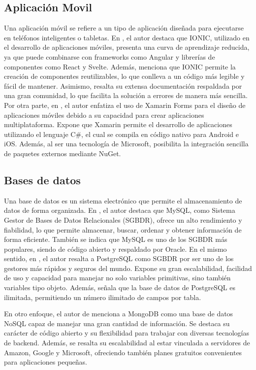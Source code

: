 \subsection{Aplicación Movil}
Una aplicación móvil se refiere a un tipo de aplicación diseñada para ejecutarse en teléfonos inteligentes o tabletas.
En \cite{chasichangoAplicacionMovilApoyo2022}, el autor destaca que IONIC, utilizado en el desarrollo de aplicaciones
móviles, presenta una curva de aprendizaje reducida, ya que puede combinarse con frameworks como Angular y librerías de
componentes como React y Svelte. Además, menciona que IONIC permite la creación de componentes reutilizables, lo que conlleva
a un código más legible y fácil de mantener. Asimismo, resalta su extensa documentación respaldada por una gran comunidad,
lo que facilita la solución a errores de manera más sencilla. Por otra parte, en \cite{lesanoperezAplicativoMovilGeoubicacion2022},
el autor enfatiza el uso de Xamarin Forms para el diseño de aplicaciones móviles debido a su capacidad para crear aplicaciones
multiplataforma. Expone que Xamarin permite el desarrollo de aplicaciones utilizando el lenguaje C\#, el cual se compila en
código nativo para Android e iOS. Además, al ser una tecnología de Microsoft, posibilita la integración sencilla de paquetes
externos mediante NuGet.

\subsection{Bases de datos}
Una base de datos es un sistema electrónico que permite el almacenamiento de datos de forma organizada.
En \cite{chicaizavillegasAplicacionWebPara2023}, el autor destaca que MySQL, como Sistema Gestor de Bases de Datos Relacionales
(SGBDR), ofrece un alto rendimiento y fiabilidad, lo que permite almacenar, buscar, ordenar y obtener información de forma eficiente.
También se indica que MySQL es uno de los SGBDR más populares, siendo de
código abierto y respaldado por Oracle. En el mismo sentido, en \cite{lesanoperezAplicativoMovilGeoubicacion2022}, el autor
resalta a PostgreSQL como SGBDR por ser uno de los gestores más rápidos y seguros del mundo. Expone su gran escalabilidad,
facilidad de uso y capacidad para manejar no solo variables primitivas, sino también variables tipo objeto. Además, señala que
la base de datos de PostgreSQL es ilimitada, permitiendo un número ilimitado de campos por tabla.

\bigbreak
En otro enfoque, el autor de \cite{chasichangoAplicacionMovilApoyo2022} menciona a MongoDB como una base de datos NoSQL capaz
de manejar una gran cantidad de información. Se destaca su carácter de código abierto y su flexibilidad para trabajar con
diversas tecnologías de backend. Además, se resalta su escalabilidad al estar vinculada a servidores de Amazon, Google y
Microsoft, ofreciendo también planes gratuitos convenientes para aplicaciones pequeñas.

